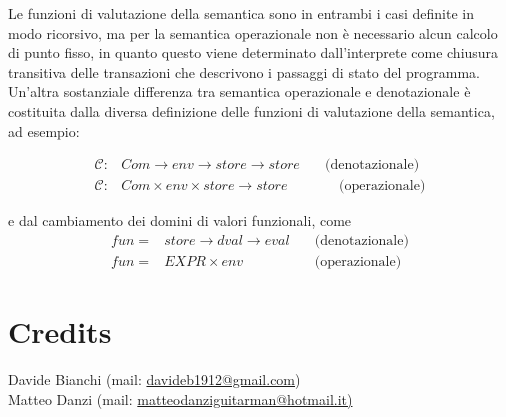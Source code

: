 \documentclass[a4paper, 10pt]{article}
\begin{document}
	Le funzioni di valutazione della semantica sono in entrambi i casi definite in modo ricorsivo, ma per la semantica operazionale non è necessario alcun calcolo di punto fisso, in quanto questo viene determinato dall'interprete come chiusura transitiva delle transazioni che descrivono i passaggi di stato del programma. \\
	
	Un'altra sostanziale differenza tra semantica operazionale e denotazionale è costituita dalla diversa definizione delle funzioni di valutazione della semantica, ad esempio: 
	
	\begin{align*}
		\mathcal{C}:&Com \to env \to store \to store \quad &\text{(denotazionale)} \\
		\mathcal{C}:&Com \times env \times store \to store &\quad \text{(operazionale)}
	\end{align*}
	
	e dal cambiamento dei domini di valori funzionali, come
	\begin{align*}
		fun =& store \to dval \to eval \quad &\text{(denotazionale)} \\
		fun =& EXPR \times env \quad &\text{(operazionale)}
	\end{align*}
	
	
	\section{Credits}
	Davide Bianchi (mail: \url{davideb1912@gmail.com}) \\
	Matteo Danzi (mail: \url{matteodanziguitarman@hotmail.it)}
	
\end{document}
